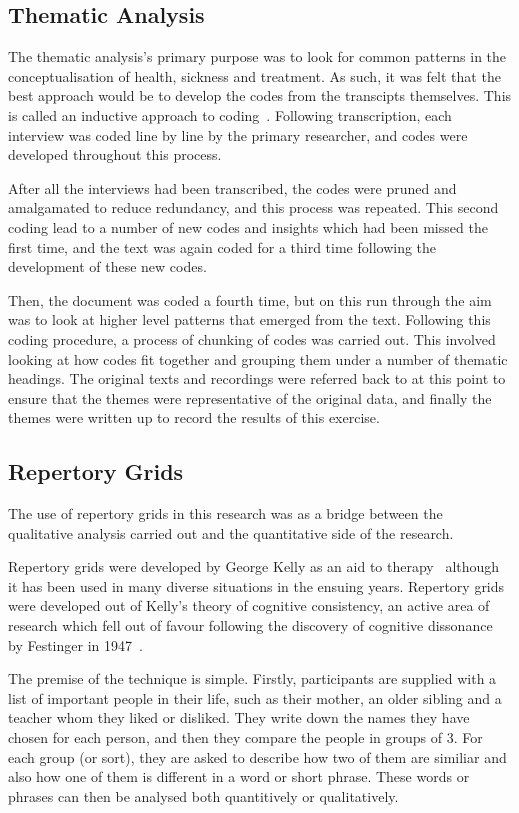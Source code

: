 \subsection{Thematic Analysis}

The thematic analysis's primary purpose was to look for common patterns in the conceptualisation of health, sickness and treatment. As such, it was felt that the best approach would be to develop the codes from the transcipts themselves. 
This is called an inductive approach to coding~\cite{haberman1979analysis}. Following transcription, each interview was coded line by line by the primary researcher, and codes were developed throughout this process.

After all the interviews had been transcribed, the codes were pruned and amalgamated to reduce redundancy, and this process was repeated. This second coding lead to a number of new codes and insights which had been missed the first time, and the text was again coded for a third time following the development of these new codes.

Then, the document was coded a fourth time, but on this run through the aim was to look at higher level patterns that emerged from the text. Following this coding procedure, a process of chunking of codes was carried out. This involved looking at how codes fit together and grouping them under a number of thematic headings. The original texts and recordings were referred back to at this point to ensure that the themes were representative of the original data, and finally the themes were written up to record the results of this exercise.


\subsection{Repertory Grids}

The use of repertory grids in this research was as a bridge between the qualitative analysis carried out and the quantitative side of the research. 

Repertory grids were developed by George Kelly as an aid to therapy~\cite{kelly2003psychology} although it has been used in many diverse situations in the ensuing years. 
Repertory grids were developed out of Kelly's theory of cognitive consistency, an active area of research which fell out of favour following the discovery of cognitive dissonance by Festinger in 1947~\cite{greenwald2002}.

The premise of the technique is simple. Firstly, participants are supplied with a list of important people in their life, such as their mother, an older sibling and a teacher whom they liked or disliked. They write down the names they have chosen for each person, and then they compare the people in groups of 3. For each group (or sort), they are asked to describe how two of them are similiar and also how one of them is different in a word or short phrase. These words or phrases can then be analysed both quantitively or qualitatively.

